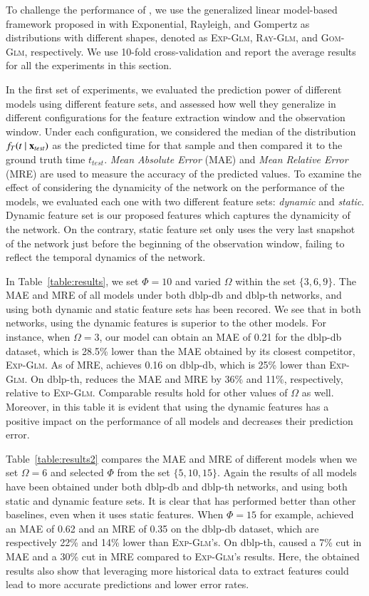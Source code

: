 To challenge the performance of \npglm, we use the generalized linear model-based framework proposed in \cite{sun2012will} with Exponential, Rayleigh, and Gompertz as distributions with different shapes, denoted as \textsc{Exp-Glm}, \textsc{Ray-Glm}, and \textsc{Gom-Glm}, respectively. We use 10-fold cross-validation and report the average results for all the experiments in this section.

In the first set of experiments, we evaluated the prediction power of different models using different feature sets, and assessed how well they generalize in different configurations for the feature extraction window and the observation window. Under each configuration, we considered the median of the distribution $f_T(t\mid \mathbf{x}_{test})$ as the predicted time for that sample and then compared it to the ground truth time $t_{test}$. \emph{Mean Absolute Error} (MAE) and \emph{Mean Relative Error} (MRE) are used to measure the accuracy of the predicted values. To examine the effect of considering the dynamicity of the network on the performance of the models, we evaluated each one with two different feature sets: \emph{dynamic} and \emph{static}. Dynamic feature set is our proposed features which captures the dynamicity of the network. On the contrary, static feature set only uses the very last snapshot of the network just before the beginning of the observation window, failing to reflect the temporal dynamics of the network. 

In Table~\ref{table:results}, we set $\Phi=10$ and varied $\Omega$ within the set $\{3,6,9\}$. The MAE and MRE of all models under both dblp-db and dblp-th networks, and using both dynamic and static feature sets has been recored. We see that in both networks, \npglm using the dynamic features is superior to the other models. For instance, when $\Omega=3$, our model \npglm can obtain an MAE of 0.21 for the dblp-db dataset, which is 28.5\% lower than the MAE obtained by its closest competitor, \textsc{Exp-Glm}. As of MRE, \npglm achieves 0.16 on dblp-db, which is 25\% lower than \textsc{Exp-Glm}. 
On dblp-th, \npglm reduces the MAE and MRE by 36\% and 11\%, respectively, relative to \textsc{Exp-Glm}. Comparable results hold for other values of $\Omega$ as well. Moreover, in this table it is evident that using the dynamic features has a positive impact on the performance of all models and decreases their prediction error.

Table~\ref{table:results2} compares the MAE and MRE of different models when we set $\Omega=6$ and selected $\Phi$ from the set $\{5,10,15\}$. Again the results of all models have been obtained under both dblp-db and dblp-th networks, and using both static and dynamic feature sets. It is clear that \npglm has performed better than other baselines, even when it uses static features.
When $\Phi=15$ for example, \npglm achieved an MAE of 0.62 and an MRE of 0.35 on the dblp-db dataset, which are respectively 22\% and 14\% lower than \textsc{Exp-Glm}'s. On dblp-th, \npglm caused a 7\% cut in MAE and a 30\% cut in MRE compared to \textsc{Exp-Glm}'s results.
Here, the obtained results also show that leveraging more historical data to extract features could lead to more accurate predictions and lower error rates.

